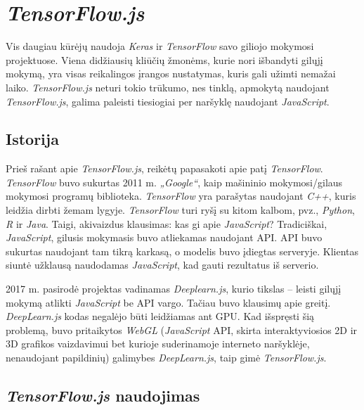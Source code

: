 \documentclass{VUMIFInfKursinis}
\begin{document}
\newpage

\section{\textit{TensorFlow.js}}
\vspace{10mm}

Vis daugiau kūrėjų naudoja \textit{Keras} ir \textit{TensorFlow} savo giliojo mokymosi projektuose. Viena didžiausių kliūčių žmonėms, kurie nori išbandyti gilųjį mokymą, yra visas reikalingos įrangos nustatymas, kuris gali užimti nemažai laiko. \textit{TensorFlow.js} neturi tokio trūkumo, nes tinklą, apmokytą naudojant \textit{TensorFlow.js}, galima paleisti tiesiogiai per naršyklę naudojant \textit{JavaScript}.\cite{12}

\subsection{Istorija}

Prieš rašant apie \textit{TensorFlow.js}, reikėtų papasakoti apie patį \textit{TensorFlow}. \textit{TensorFlow} buvo sukurtas 2011 m. \textit{„Google“}, kaip mašininio mokymosi/gilaus mokymosi programų biblioteka. \textit{TensorFlow} yra parašytas naudojant \textit{C++}, kuris leidžia dirbti žemam lygyje. \textit{TensorFlow} turi ryšį su kitom kalbom, pvz., \textit{Python}, \textit{R} ir \textit{Java}.  Taigi, akivaizdus klausimas: kas gi apie \textit{JavaScript}? Tradiciškai, \textit{JavaScript}, gilusis mokymasis buvo atliekamas naudojant API. API buvo sukurtas naudojant tam tikrą karkasą, o modelis buvo įdiegtas serveryje. Klientas siuntė užklausą naudodamas \textit{JavaScript}, kad gauti rezultatus iš serverio. 
\par
2017 m. pasirodė projektas vadinamas \textit{Deeplearn.js}, kurio tikslas -- leisti gilųjį mokymą atlikti \textit{JavaScript} be API vargo. Tačiau buvo klausimų apie greitį. \textit{DeepLearn.js} kodas negalėjo būti leidžiamas ant GPU. Kad išspręsti šią problemą, buvo pritaikytos \textit{WebGL} (\textit{JavaScript} API, skirta interaktyviosios 2D ir 3D grafikos vaizdavimui bet kurioje suderinamoje interneto naršyklėje, nenaudojant papildinių) galimybes \textit{DeepLearn.js}, taip gimė \textit{TensorFlow.js}. \cite{12}

\subsection{\textit{TensorFlow.js} naudojimas}
\end{document}
